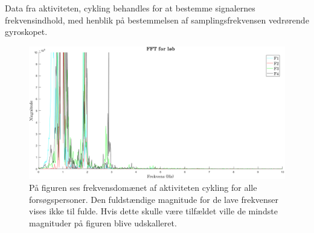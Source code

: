 Data fra aktiviteten, cykling behandles for at bestemme signalernes frekvensindhold, med henblik på bestemmelsen af samplingsfrekvensen vedrørende gyroskopet.
\begin{figure}[H]
	\centering
	\includegraphics[scale=0.40]{figures/qBilag/cykling_frekvens}
	\caption{På figuren ses frekvensdomænet af aktiviteten cykling for alle forsøgspersoner. Den fuldstændige magnitude for de lave frekvenser vises ikke til fulde. Hvis dette skulle være tilfældet ville de mindste magnituder på figuren blive udskalleret.}
	\label{fig:Ap_cyklingfrekvens}
\end{figure}\vspace{-.25cm}

